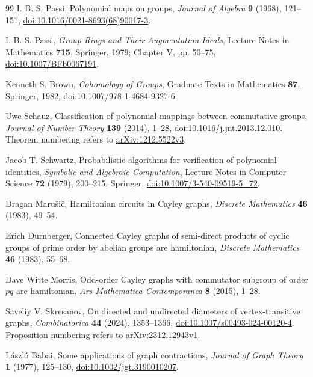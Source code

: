 \documentclass[11pt,a4paper,reqno]{amsart}
\theoremstyle{definition}
\theoremstyle{remark}
\numberwithin{equation}{section}
\begin{document}
\begin{thebibliography}{99}
I. B. S. Passi, Polynomial maps on groups, \emph{Journal of Algebra} \textbf{9} (1968), 121--151, \href{https://doi.org/10.1016/0021-8693(68)90017-3}{doi:10.1016/0021-8693(68)90017-3}.

I. B. S. Passi, \emph{Group Rings and Their Augmentation Ideals}, Lecture Notes in Mathematics \textbf{715}, Springer, 1979; Chapter V, pp. 50--75, \href{https://doi.org/10.1007/BFb0067191}{doi:10.1007/BFb0067191}.

Kenneth S. Brown, \emph{Cohomology of Groups}, Graduate Texts in Mathematics \textbf{87}, Springer, 1982, \href{https://doi.org/10.1007/978-1-4684-9327-6}{doi:10.1007/978-1-4684-9327-6}.

Uwe Schauz, Classification of polynomial mappings between commutative groups, \emph{Journal of Number Theory} \textbf{139} (2014), 1--28, \href{https://doi.org/10.1016/j.jnt.2013.12.010}{doi:10.1016/j.jnt.2013.12.010}. Theorem numbering refers to \href{https://arxiv.org/abs/1212.5522v3}{arXiv:1212.5522v3}.

Jacob T. Schwartz, Probabilistic algorithms for verification of polynomial identities, \emph{Symbolic and Algebraic Computation}, Lecture Notes in Computer Science \textbf{72} (1979), 200--215, Springer, \href{https://doi.org/10.1007/3-540-09519-5_72}{doi:10.1007/3-540-09519-5\_72}.

Dragan Maru\v{s}i\v{c}, Hamiltonian circuits in Cayley graphs, \emph{Discrete Mathematics} \textbf{46} (1983), 49--54.

Erich Durnberger, Connected Cayley graphs of semi-direct products of cyclic groups of prime order by abelian groups are hamiltonian, \emph{Discrete Mathematics} \textbf{46} (1983), 55--68.

Dave Witte Morris, Odd-order Cayley graphs with commutator subgroup of order $pq$ are hamiltonian, \emph{Ars Mathematica Contemporanea} \textbf{8} (2015), 1--28.

Saveliy V. Skresanov, On directed and undirected diameters of vertex-transitive graphs, \emph{Combinatorica} \textbf{44} (2024), 1353--1366, \href{https://doi.org/10.1007/s00493-024-00120-4}{doi:10.1007/s00493-024-00120-4}. Proposition numbering refers to \href{https://arxiv.org/abs/2312.12943v1}{arXiv:2312.12943v1}.

L\'aszl\'o Babai, Some applications of graph contractions, \emph{Journal of Graph Theory} \textbf{1} (1977), 125--130, \href{https://doi.org/10.1002/jgt.3190010207}{doi:10.1002/jgt.3190010207}.


\end{thebibliography}
\end{document}
